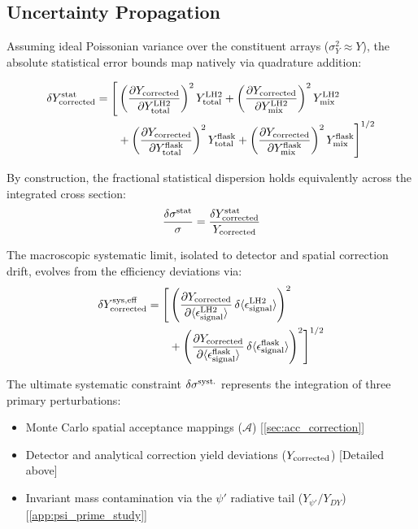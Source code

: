 \documentclass[11pt]{article}
\begin{document}
\subsection*{Uncertainty Propagation}
Assuming ideal Poissonian variance over the constituent arrays ($\sigma^2_Y \approx Y$), the absolute statistical error bounds map natively via quadrature addition:

\begin{equation}
\begin{split}
\delta Y^{\rm stat}_{\rm corrected} = 
\Biggl[ & \left( \frac{\partial Y_{\rm corrected}}{\partial Y^{\textrm{LH2}}_{\textrm{total}} } \right)^2 Y^{\textrm{LH2}}_{\textrm{total}} 
+ \left( \frac{\partial Y_{\rm corrected}}{\partial Y^{\textrm{LH2}}_{\textrm{mix}} } \right)^2 Y^{\textrm{LH2}}_{\textrm{mix}} \\
& + \left( \frac{\partial Y_{\rm corrected}}{\partial Y^{\textrm{flask}}_{\textrm{total}} } \right)^2 Y^{\textrm{flask}}_{\textrm{total}} 
+ \left( \frac{\partial Y_{\rm corrected}}{\partial Y^{\textrm{flask}}_{\textrm{mix}} } \right)^2 Y^{\textrm{flask}}_{\textrm{mix}} \Biggr]^{1/2}
\end{split}
\end{equation}

By construction, the fractional statistical dispersion holds equivalently across the integrated cross section:
\begin{equation}
\frac{\delta \sigma^{\rm stat}}{\sigma} = \frac{\delta Y^{\rm stat}_{\rm corrected}}{Y_{\rm corrected}}
\end{equation}

The macroscopic systematic limit, isolated to detector and spatial correction drift, evolves from the efficiency deviations via:
\begin{equation}
\begin{split}
\delta Y^{\rm sys, eff}_{\rm corrected} = 
\Biggl[ & \left( \frac{\partial Y_{\rm corrected}}{\partial \langle\epsilon^{\textrm{LH2}}_{\textrm{signal}}\rangle} \, \delta \langle\epsilon^{\textrm{LH2}}_{\textrm{signal}}\rangle \right)^2 \\
& + \left( \frac{\partial Y_{\rm corrected}}{\partial \langle\epsilon^{\textrm{flask}}_{\textrm{signal}}\rangle} \, \delta \langle\epsilon^{\textrm{flask}}_{\textrm{signal}}\rangle \right)^2 \Biggr]^{1/2}
\end{split}
\end{equation}

The ultimate systematic constraint $\delta\sigma^{\rm syst.}$ represents the integration of three primary perturbations:
 \begin{itemize}
 \item Monte Carlo spatial acceptance mappings ($\mathcal{A}$) [\cref{sec:acc_correction}]
 \item Detector and analytical correction yield deviations ($Y_{\rm corrected}$) [Detailed above]
 \item Invariant mass contamination via the $\psi'$ radiative tail ($Y_{\psi'}/Y_{DY}$) [\cref{app:psi_prime_study}]
 \end{itemize}
\end{document}
